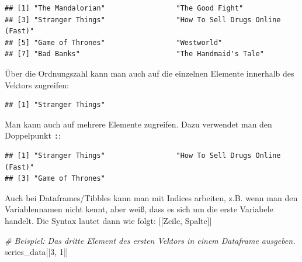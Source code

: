 \documentclass[
]{book}
\newenvironment{Shaded}{\begin{snugshade}}{\end{snugshade}}
\newcommand{\CommentTok}[1]{\textcolor[rgb]{0.56,0.35,0.01}{\textit{#1}}}
\newcommand{\DecValTok}[1]{\textcolor[rgb]{0.00,0.00,0.81}{#1}}
\newcommand{\NormalTok}[1]{#1}
\newcommand{\SpecialCharTok}[1]{\textcolor[rgb]{0.00,0.00,0.00}{#1}}
\begin{document}
\begin{verbatim}
## [1] "The Mandalorian"                 "The Good Fight"                 
## [3] "Stranger Things"                 "How To Sell Drugs Online (Fast)"
## [5] "Game of Thrones"                 "Westworld"                      
## [7] "Bad Banks"                       "The Handmaid's Tale"
\end{verbatim}

Über die Ordnungszahl kann man auch auf die einzelnen Elemente innerhalb des Vektors zugreifen:

\begin{Shaded}
\end{Shaded}

\begin{verbatim}
## [1] "Stranger Things"
\end{verbatim}

Man kann auch auf mehrere Elemente zugreifen. Dazu verwendet man den Doppelpunkt \texttt{:}:

\begin{Shaded}
\end{Shaded}

\begin{verbatim}
## [1] "Stranger Things"                 "How To Sell Drugs Online (Fast)"
## [3] "Game of Thrones"
\end{verbatim}

Auch bei Dataframes/Tibbles kann man mit Indices arbeiten, z.B. wenn man den Variablennamen nicht kennt, aber weiß, dass es sich um die erste Variabele handelt. Die Syntax lautet dann wie folgt: {[}{[}Zeile, Spalte{]}{]}

\begin{Shaded}
\begin{Highlighting}[]
\CommentTok{\# Beispiel: Das dritte Element des ersten Vektors in einem Dataframe ausgeben.}
\NormalTok{series\_data[[}\DecValTok{3}\NormalTok{, }\DecValTok{1}\NormalTok{]]}
\end{Highlighting}
\end{Shaded}
\end{document}
